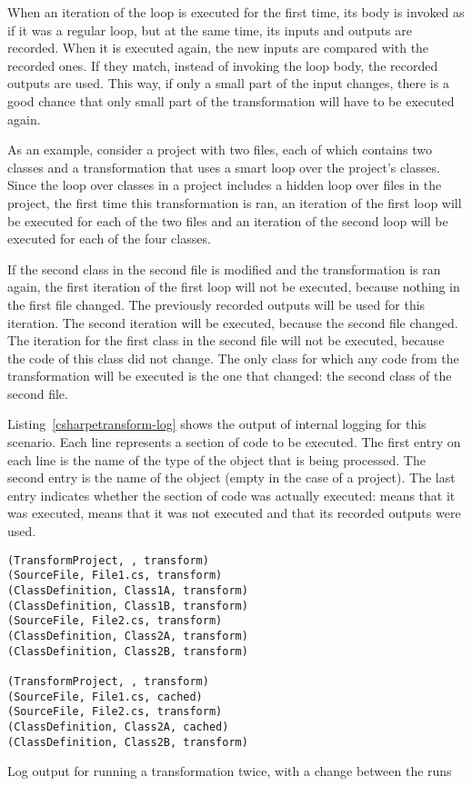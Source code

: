 When an iteration of the loop is executed for the first time, its body is invoked as if it was a regular  loop, but at the same time, its inputs and outputs are recorded. When it is executed again, the new inputs are compared with the recorded ones. If they match, instead of invoking the loop body, the recorded outputs are used. This way, if only a small part of the input changes, there is a good chance that only small part of the transformation will have to be executed again.

\medskip

As an example, consider a project with two files, each of which contains two classes and a transformation that uses a smart  loop over the project's classes. Since the loop over classes in a project includes a hidden loop over files in the project, the first time this transformation is ran, an iteration of the first loop will be executed for each of the two files and an iteration of the second loop will be executed for each of the four classes.

If the second class in the second file is modified and the transformation is ran again, the first iteration of the first loop will not be executed, because nothing in the first file changed. The previously recorded outputs will be used for this iteration. The second iteration will be executed, because the second file changed. The iteration for the first class in the second file will not be executed, because the code of this class did not change. The only class for which any code from the transformation will be executed is the one that changed: the second class of the second file.

Listing~\ref{csharpetransform-log} shows the output of internal logging for this scenario. Each line represents a section of code to be executed. The first entry on each line is the name of the type of the object that is being processed. The second entry is the name of the object (empty in the case of a project). The last entry indicates whether the section of code was actually executed:  means that it was executed,  means that it was not executed and that its recorded outputs were used.

\begin{listing}
\begin{verbatim}
(TransformProject, , transform)
(SourceFile, File1.cs, transform)
(ClassDefinition, Class1A, transform)
(ClassDefinition, Class1B, transform)
(SourceFile, File2.cs, transform)
(ClassDefinition, Class2A, transform)
(ClassDefinition, Class2B, transform)

(TransformProject, , transform)
(SourceFile, File1.cs, cached)
(SourceFile, File2.cs, transform)
(ClassDefinition, Class2A, cached)
(ClassDefinition, Class2B, transform)
\end{verbatim}
\caption{Log output for running a transformation twice, with a change between the runs}
\label{csharpetransform-log}
\end{listing}

